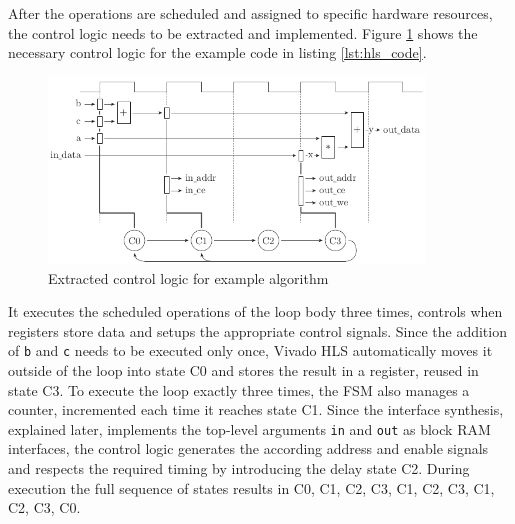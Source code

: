 After the operations are scheduled and assigned to specific hardware
resources, the control logic needs to be extracted and implemented. Figure
\ref{fig:hls_c} shows the necessary control logic for the example code in
listing \ref{lst:hls_code}.
\begin{figure}[tb]
	\centering
	\includegraphics[width=10cm]{../figures/hls_c}
	\caption{Extracted control logic for example algorithm}
	\label{fig:hls_c}
\end{figure}
It executes the scheduled operations of the loop body three times, controls
when registers store data and setups the appropriate control signals. Since
the addition of \lstinline{b} and \lstinline{c} needs to be executed only
once, Vivado \ac{HLS} automatically moves it outside of the loop into state C0
and stores the result in a register, reused in state C3. To execute the loop
exactly three times, the \ac{FSM} also manages a counter, incremented each
time it reaches state C1. Since the interface synthesis, explained later,
implements the top-level arguments \lstinline{in} and \lstinline{out} as block
\ac{RAM} interfaces, the control logic generates the according address and
enable signals and respects the required timing by introducing the delay state
C2. During execution the full sequence of states results in C0, C1, C2, C3, C1, C2, C3, C1, C2, C3, C0.


